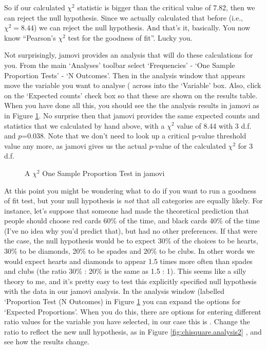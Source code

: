 So if our calculated $\chi^2$ statistic is bigger than the critical value of 7.82, then we can reject the null hypothesis. Since we actually calculated that before (i.e., $\chi^2 = 8.44$) we can reject the null hypothesis.  And that's it, basically. You now know ``Pearson's $\chi^2$ test for the goodness of fit''. Lucky you.



Not surprisingly, jamovi provides an analysis that will do these calculations for you. From the main `Analyses' toolbar select `Frequencies' - `One Sample Proportion Tests' - `N Outcomes'. Then in the analysis window that appears move the variable you want to analyse ( across into the `Variable' box. Also, click on the `Expected counts' check box so that these are shown on the results table. When you have done all this, you should see the the analysis results in jamovi as in Figure \ref{fig:chisquare.analysis1}. No surprise then that jamovi provides the same expected counts and statistics that we calculated by hand above, with a $\chi^2$ value of 8.44 with 3 d.f. and $p$=0.038. Note that we don't need to look up a critical p-value threshold value any more, as jamovi gives us the actual $p$-value of the calculated $\chi^2$ for 3 d.f.  

\begin{figure}
\begin{center}
\caption{A $\chi^2$ One Sample Proportion Test in jamovi}
\label{fig:chisquare.analysis1}
\HR
\end{center}
\end{figure}



At this point you might be wondering what to do if you want to run a goodness of fit test, but your null hypothesis is {\it not} that all categories are equally likely. For instance, let's suppose that someone had made the theoretical prediction that people should choose red cards 60\% of the time, and black cards 40\% of the time (I've no idea why you'd predict that), but had no other preferences. If that were the case, the null hypothesis would be to expect 30\% of the choices to be hearts, 30\% to be diamonds, 20\% to be spades and 20\% to be clubs. In other words we would expect hearts and diamonds to appear 1.5 times more often than spades and clubs (the ratio 30\% : 20\% is the same as 1.5 : 1). This seems like a silly theory to me, and it's pretty easy to test this explicitly specified null hypothesis with the data in our jamovi analysis. In the analysis window (labelled `Proportion Test (N Outcomes) in Figure \ref{fig:chisquare.analysis1} you can expand the options for `Expected Proportions'. When you do this, there are options for entering different ratio values for the variable you have selected, in our case this is . Change the ratio to reflect the new null hypothesis, as in Figure \ref{fig:chisquare.analysis2} , and see how the results change. 

